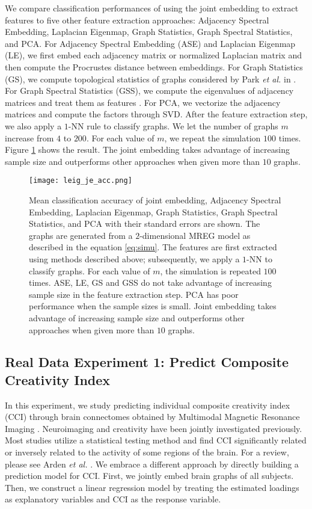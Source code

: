 \documentclass[10pt,journal,compsoc]{IEEEtran}
\begin{document}
\noindent We compare classification performances of using the joint embedding to extract features to five other feature extraction approaches: Adjacency Spectral Embedding, Laplacian Eigenmap, Graph Statistics, Graph Spectral Statistics, and PCA. For Adjacency Spectral Embedding (ASE) and Laplacian Eigenmap (LE), we first embed each adjacency matrix or normalized Laplacian matrix and then compute the Procrustes distance between embeddings. For Graph Statistics (GS), we compute topological statistics of graphs considered by Park \textit{et al.} in \cite{park2013anomaly}. For Graph Spectral Statistics (GSS), we compute the eigenvalues of adjacency matrices and treat them as features \cite{dorogovtsev2003spectra}. For PCA, we vectorize the adjacency matrices and compute the factors through SVD. After the feature extraction step, we also apply a $1$-NN rule to classify graphs. We let the number of graphs $m$ increase from $4$ to $200$. For each value of $m$, we repeat the simulation $100$ times. Figure \ref{fig:acc} shows the result. The joint embedding takes advantage of increasing sample size and outperforms other approaches when given more than $10$ graphs. 
\begin{figure}[!htbp]
	\centering
	\texttt{[image: leig\_je\_acc.png]}
	\caption{Mean classification accuracy of joint embedding, Adjacency Spectral Embedding, Laplacian Eigenmap, Graph Statistics, Graph Spectral Statistics, and PCA with their standard errors are shown. The graphs are generated from a $2$-dimensional MREG model as described in the equation \eqref{eq:simu}. The features are first extracted using methods described above; subsequently, we apply a $1$-NN to classify graphs. For each value of $m$, the simulation is repeated $100$ times. ASE, LE, GS and GSS do not take advantage of increasing sample size in the feature extraction step. PCA has poor performance when the sample sizes is small. Joint embedding takes advantage of increasing sample size and outperforms other approaches when given more than $10$ graphs. }
	\label{fig:acc}
\end{figure} 

\subsection{Real Data Experiment 1: Predict Composite Creativity Index}
In this experiment, we study predicting individual composite creativity index (CCI) through brain connectomes obtained by Multimodal Magnetic Resonance Imaging \cite{koutra2013d}. Neuroimaging and creativity have been jointly investigated previously. Most studies utilize a statistical testing method and find CCI significantly related or inversely related to the activity of some regions of the brain. For a review, please see Arden \textit{et al.} \cite{arden2010neuroimaging}. We embrace a different approach by directly building a prediction model for CCI. First, we jointly embed brain graphs of all subjects. Then, we construct a linear regression model by treating the estimated loadings as explanatory variables and CCI as the response variable. \\
\end{document}
